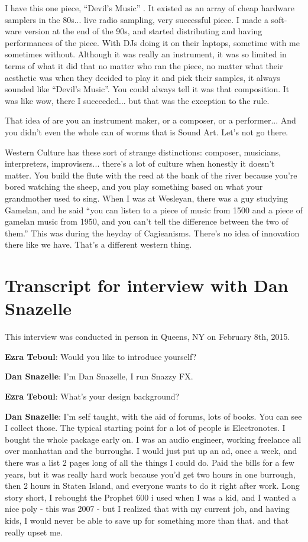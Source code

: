 I have this one piece, ``Devil’s Music'' \citep{collinsdevila,collinsdevilb}. It existed as an array of cheap hardware samplers in the 80s... live radio sampling, very successful piece. I made a soft- ware version at the end of the 90s, and started distributing and having performances of the piece. With DJs doing it on their laptops, sometime with me sometimes without. Although it was really an instrument, it was so limited in terms of what it did that no matter who ran the piece, no matter what their aesthetic was when they decided to play it and pick their samples, it always sounded like ``Devil’s Music''. You could always tell it was that composition. It was like wow, there I succeeded... but that was the exception to the rule.
					
That idea of are you an instrument maker, or a composer, or a performer... And you didn’t even the whole can of worms that is Sound Art. Let’s not go there.
					
Western Culture has these sort of strange distinctions: composer, musicians, interpreters, improvisers... there’s a lot of culture when honestly it doesn’t matter. You build the flute with the reed at the bank of the river because you’re bored watching the sheep, and you play something based on what your grandmother used to sing. When I was at Wesleyan, there was a guy studying Gamelan, and he said ``you can listen to a piece of music from 1500 and a piece of gamelan music from 1950, and you can’t tell the difference between the two of them.'' This was during the heyday of Cagieanisms. There’s no idea of innovation there like we have. That’s a different western thing. 

\newpage

\clearpage 
\section{Transcript for interview with Dan Snazelle}

This interview was conducted in person in Queens, NY on February 8th, 2015. 

\textbf{Ezra Teboul}: Would you like to introduce yourself? 

\textbf{Dan Snazelle}: I'm Dan Snazelle, I run Snazzy FX.

\textbf{Ezra Teboul}: What's your design background? 

\textbf{Dan Snazelle}: I'm self taught, with the aid of forums, lots of books. You can see I collect those. The typical starting point for a lot of people is Electronotes. I bought the whole package early on. I was an audio engineer, working freelance all over manhattan and the burroughs. I would just put up an ad, once a week, and there was a list 2 pages long of all the things I could do. Paid the bills for a few years, but it was really hard work because you'd get two hours in one burrough, then 2 hours in Staten Island, and everyone wants to do it right after work. Long story short, I rebought the Prophet 600 i used when I was a kid, and I wanted a nice poly - this was 2007 - but I realized that with my current job, and having kids, I would never be able to save up for something more than that. and that really upset me. 

